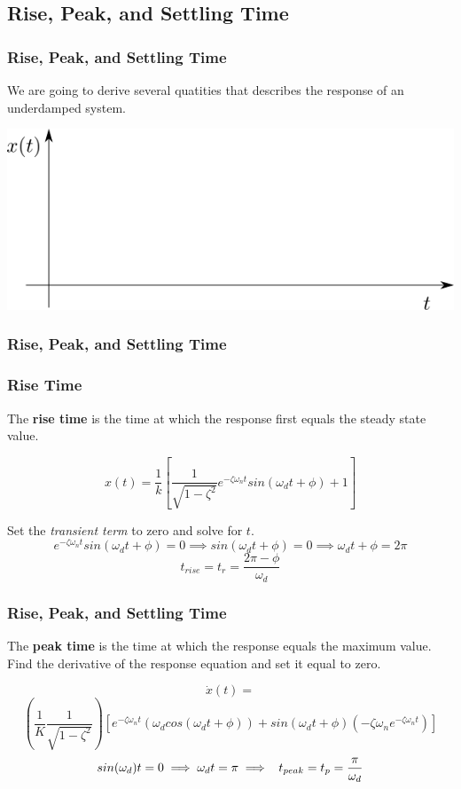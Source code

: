 \documentclass[fleqn]{beamer} %
\newcommand{\sectionIVsubsectionIItitle}{Rise, Peak, and Settling Time}
\begin{document}
		\subsection{\sectionIVsubsectionIItitle}\label{sectionIVsubsectionII}	

			\begin{frame}
				\frametitle{\sectionIVsubsectionIItitle}
				\bigskip


				We are going to derive several quatities that describes the response of an underdamped system. \vspc

				\includegraphics[scale=0.7]{images/lecture3_fig1.png}

				\btVFill
			\end{frame}

			\begin{frame}
				\frametitle{\sectionIVsubsectionIItitle}
				\bigskip

				\frametitle{Rise Time}

				The {\bf rise time} is the time at which the response first equals the steady state value.\vspc

				\[ x(t)=\frac{1}{k}\left[\frac{1}{\sqrt{1-\zeta^2}}e^{-\zeta\omega_nt}sin(\omega_dt+\phi)+1\right] \] 

				Set the {\it transient term} to zero and solve for $t$.\vspc
				\[ e^{-\zeta\omega_nt}sin(\omega_dt+\phi)=0 \implies sin(\omega_dt+\phi)=0\implies \omega_dt+\phi=2\pi \]
				\[ t_{rise}=t_r=\frac{2\pi-\phi}{\omega_d} \]


				\btVFill
			\end{frame}

			\begin{frame}
				\frametitle{\sectionIVsubsectionIItitle}
				\bigskip

				The {\bf peak time} is the time at which the response equals the maximum value. Find the derivative of the response equation and set it equal to zero. \vspc

				\[ \dot{x}(t)= \]
				\[ \left(\frac{1}{K}\frac{1}{\sqrt{1-\zeta^2}}\right)\left[ e^{-\zeta\omega_nt}(\omega_dcos(\omega_dt+\phi))+sin(\omega_dt+\phi)(-\zeta\omega_ne^{-\zeta\omega_nt})\right] \] 
				\[ sin(\omega_d)t=0\implies \omega_dt=\pi \implies \hspc t_{peak}= t_p=\frac{\pi}{\omega_d} \] 


				\btVFill
			\end{frame}
\end{document}
